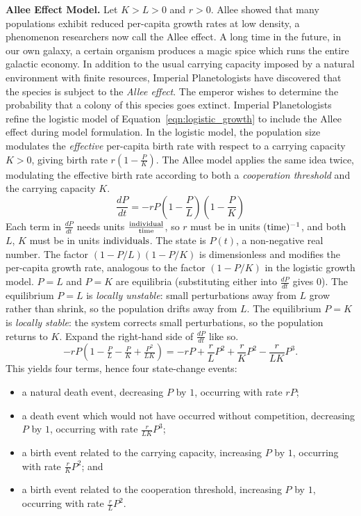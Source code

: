 \begin{example}
\label{ex:allee}
\textbf{Allee Effect Model.}
Let $K > L > 0$ and $r > 0$. Allee \cite{allee1931animal} showed that many populations exhibit reduced per-capita growth rates at low density, a phenomenon researchers now call the Allee effect.
A long time in the future, in our own galaxy, a certain organism produces a magic spice which runs the entire galactic economy.
In addition to the usual carrying capacity imposed by a natural environment with finite resources, Imperial Planetologists have discovered that the species is subject to the \textit{Allee effect}.
The emperor wishes to determine the probability that a colony of this species goes extinct.
Imperial Planetologists refine the logistic model of Equation~\ref{eqn:logistic_growth} to include the Allee effect during model formulation.
In the logistic model, the population size modulates the \textit{effective} per-capita birth rate with respect to a carrying capacity $K > 0$, giving birth rate $r(1-\frac{P}{K})$.
The Allee model applies the same idea twice, modulating the effective birth rate according to both a \textit{cooperation threshold} and the carrying capacity $K$.
\begin{equation}
\label{eqn:allee}
\frac{dP}{dt} = -r P(1-\frac{P}{L})(1- \frac{P}{K})
\end{equation}
Each term in $\frac{dP}{dt}$ needs units $\frac{\textup{individual}}{\textup{time}}$, so $r$ must be in units $(\textup{time})^{-1}$, and both $L$, $K$ must be in units $\textup{individuals}$. The state is $P(t)$, a non-negative real number. The factor $(1 - P/L)(1 - P/K)$ is dimensionless and modifies the per-capita growth rate, analogous to the factor $(1 - P/K)$ in the logistic growth model. $P = L$ and $P = K$ are equilibria (substituting either into $\frac{dP}{dt}$ gives $0$). The equilibrium $P = L$ is \emph{locally unstable}: small perturbations away from $L$ grow rather than shrink, so the population drifts away from $L$. The equilibrium $P = K$ is \emph{locally stable}: the system corrects small perturbations, so the population returns to $K$.
Expand the right-hand side of $\frac{dP}{dt}$ like so.
\[
-rP\left(1 - \tfrac{P}{L} - \tfrac{P}{K} + \tfrac{P^2}{LK}\right)
= -rP + \frac{r}{L}P^2 + \frac{r}{K}P^2 - \frac{r}{LK}P^3.
\]
This yields four terms, hence four state-change events:
\begin{itemize}
\item a natural death event, decreasing $P$ by $1$, occurring with rate $rP$;
\item a death event which would not have occurred without competition, decreasing $P$ by $1$, occurring with rate $\frac{r}{LK}P^3$;
\item a birth event related to the carrying capacity, increasing $P$ by $1$, occurring with rate $\frac{r}{K}P^2$; and
\item a birth event related to the cooperation threshold, increasing $P$ by $1$, occurring with rate $\frac{r}{L}P^2$.
\end{itemize}


\end{example}
